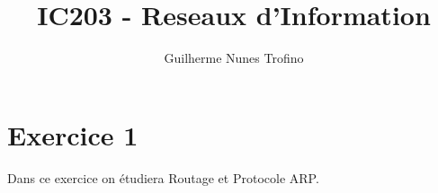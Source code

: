 \documentclass{article}
\title{IC203 - Reseaux d'Information}
\author{Guilherme Nunes Trofino}
\begin{document}
\maketitle
\setlength{\parindent}{0pt}

\newcommand{\adressRTP}[4]{
    \begin{table}[H]
        \centering\begin{tabular}{|rlrl}
            \multicolumn{4}{|l}{\textbf{#1}}\\
            \hline
            Adr.IP:  & #2  & Masque: & 255.255.254.0\\
            Adr.MAC: & #3 & & \\
            \hline
             #4
        \end{tabular}
    \end{table}
}



\section*{Exercice 1}
\noindent Dans ce exercice on étudiera Routage et Protocole ARP.\\
\end{document}
